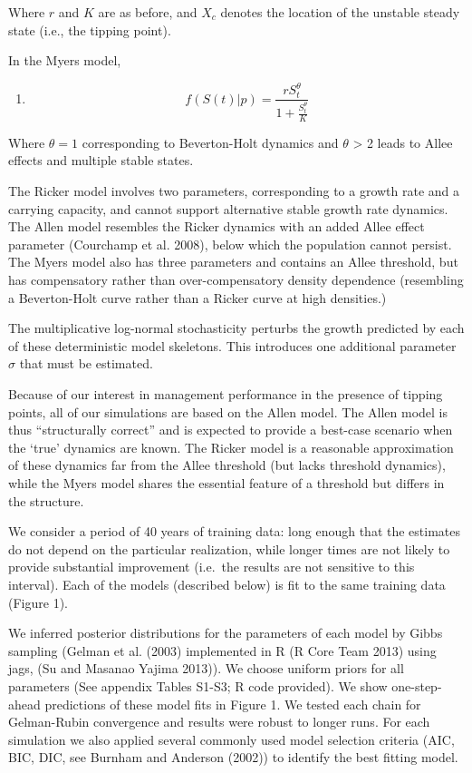 \documentclass[]{components/elsarticle}
\begin{document}
Where $r$ and $K$ are as before, and $X_c$ denotes the location of the
unstable steady state (i.e., the tipping point).

In the Myers model,

\begin{enumerate}
\def\labelenumi{(\arabic{enumi})}
\setcounter{enumi}{2}
\itemsep1pt\parskip0pt
\item
  \[ f(S(t) | p)  = \frac{r S_t^{\theta}}{1 + \frac{S_t^\theta}{K}}\]
\end{enumerate}

Where $\theta = 1$ corresponding to Beverton-Holt dynamics and $\theta$
\textgreater{} 2 leads to Allee effects and multiple stable states.

The Ricker model involves two parameters, corresponding to a growth rate
and a carrying capacity, and cannot support alternative stable growth
rate dynamics. The Allen model resembles the Ricker dynamics with an
added Allee effect parameter (Courchamp et al. 2008), below which the
population cannot persist. The Myers model also has three parameters and
contains an Allee threshold, but has compensatory rather than
over-compensatory density dependence (resembling a Beverton-Holt curve
rather than a Ricker curve at high densities.)

The multiplicative log-normal stochasticity perturbs the growth
predicted by each of these deterministic model skeletons. This
introduces one additional parameter $\sigma$ that must be estimated.

Because of our interest in management performance in the presence of
tipping points, all of our simulations are based on the Allen model. The
Allen model is thus ``structurally correct'' and is expected to provide
a best-case scenario when the `true' dynamics are known. The Ricker
model is a reasonable approximation of these dynamics far from the Allee
threshold (but lacks threshold dynamics), while the Myers model shares
the essential feature of a threshold but differs in the structure.

We consider a period of 40 years of training data: long enough that the
estimates do not depend on the particular realization, while longer
times are not likely to provide substantial improvement (i.e.~the
results are not sensitive to this interval). Each of the models
(described below) is fit to the same training data (Figure 1).

We inferred posterior distributions for the parameters of each model by
Gibbs sampling (Gelman et al. (2003) implemented in R (R Core Team 2013)
using jags, (Su and Masanao Yajima 2013)). We choose uniform priors for
all parameters (See appendix Tables S1-S3; R code provided). We show
one-step-ahead predictions of these model fits in Figure 1. We tested
each chain for Gelman-Rubin convergence and results were robust to
longer runs. For each simulation we also applied several commonly used
model selection criteria (AIC, BIC, DIC, see Burnham and Anderson
(2002)) to identify the best fitting model.
\end{document}
